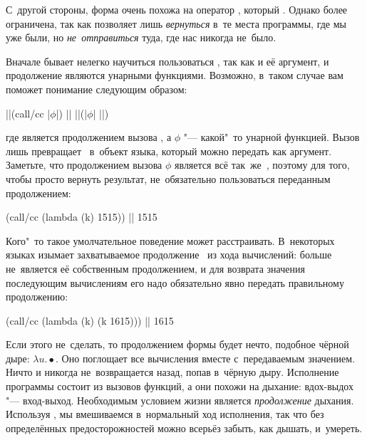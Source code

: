 С~другой стороны, форма  очень похожа на оператор , который
. Однако  более ограничена, так как
позволяет лишь \emph{вернуться} в~те места программы, где мы уже были, но
\emph{не~отправиться} туда, где нас никогда не~было.

Вначале бывает нелегко научиться пользоваться , так как и её
аргумент, и продолжение являются унарными функциями. Возможно, в~таком случае
вам поможет понимание  следующим образом:

\begin{code:lisp}
||(call/cc |$\phi$|) |\is| ||(|$\phi$| ||)
\end{code:lisp}

\noindent
где  является продолжением вызова , а $\phi$ "--- какой"~то
унарной функцией. Вызов  лишь превращает~ в~объект языка,
который можно передать как аргумент. Заметьте, что продолжением вызова $\phi$
является всё так~же~, поэтому для того, чтобы просто вернуть результат,
не~обязательно пользоваться переданным продолжением:

\begin{code:lisp}
(call/cc (lambda (k) 1515)) |\is| 1515
\end{code:lisp}

Кого"~то такое умолчательное поведение может расстраивать. В~некоторых языках
 изымает захватываемое продолжение~ из хода вычислений: 
больше не~является её собственным продолжением, и для возврата значения
последующим вычислениям его надо обязательно явно передать правильному
продолжению:

\begin{code:lisp}
(call/cc (lambda (k) (k 1615))) |\is| 1615
\end{code:lisp}

Если этого не~сделать, то продолжением формы  будет нечто, подобное
чёрной дыре: $\lambda u.\bullet$. Оно поглощает все вычисления вместе
с~передаваемым значением. Ничто и никогда не~возвращается назад, попав в~чёрную
дыру. Исполнение программы состоит из вызовов функций, а они похожи на дыхание:
вдох-выдох "--- вход-выход. Необходимым условием жизни является
\emph{продолжение} дыхания. Используя , мы вмешиваемся в~нормальный
ход исполнения, так что без определённых предосторожностей можно всерьёз забыть,
как дышать, и~умереть.


